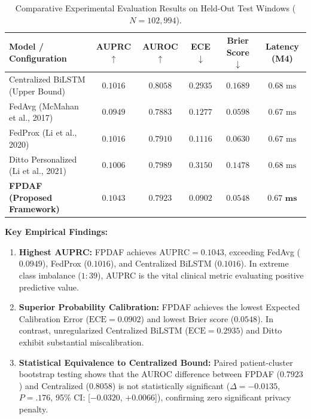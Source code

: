 \documentclass[11pt, a4paper]{article}
\begin{document}
\begin{table}[!htbp]
    \centering
    \footnotesize
    \renewcommand{\arraystretch}{1.15}
    \begin{tabular}{l c c c c c}
        \toprule
        \textbf{Model / Configuration} & \textbf{AUPRC $\uparrow$} & \textbf{AUROC $\uparrow$} & \textbf{ECE $\downarrow$} & \textbf{Brier Score $\downarrow$} & \textbf{Latency (M4)} \\
        \midrule
        Centralized BiLSTM (Upper Bound) & $0.1016$ & $\mathbf{0.8058}$ & $0.2935$ & $0.1689$ & $0.68\text{ ms}$ \\
        FedAvg (McMahan et al., 2017) & $0.0949$ & $0.7883$ & $0.1277$ & $0.0598$ & $0.67\text{ ms}$ \\
        FedProx (Li et al., 2020) & $0.1016$ & $0.7910$ & $0.1116$ & $0.0630$ & $0.67\text{ ms}$ \\
        Ditto Personalized (Li et al., 2021) & $0.1006$ & $0.7989$ & $0.3150$ & $0.1478$ & $0.68\text{ ms}$ \\
        \midrule
        \textbf{FPDAF (Proposed Framework)} & $\mathbf{0.1043}$ & $0.7923$ & $\mathbf{0.0902}$ & $\mathbf{0.0548}$ & $\mathbf{0.67\text{ ms}}$ \\
        \bottomrule
    \end{tabular}
    \caption{Comparative Experimental Evaluation Results on Held-Out Test Windows ($N = 102,994$).}
    \label{tab:benchmarks}
\end{table}

\noindent
\textbf{Key Empirical Findings:}
\begin{enumerate}[noitemsep, topsep=2pt]
    \item \textbf{Highest AUPRC:} FPDAF achieves $\text{AUPRC} = 0.1043$, exceeding FedAvg ($0.0949$), FedProx ($0.1016$), and Centralized BiLSTM ($0.1016$). In extreme class imbalance ($1:39$), AUPRC is the vital clinical metric evaluating positive predictive value.
    \item \textbf{Superior Probability Calibration:} FPDAF achieves the lowest Expected Calibration Error ($\text{ECE} = 0.0902$) and lowest Brier score ($0.0548$). In contrast, unregularized Centralized BiLSTM ($\text{ECE} = 0.2935$) and Ditto exhibit substantial miscalibration.
    \item \textbf{Statistical Equivalence to Centralized Bound:} Paired patient-cluster bootstrap testing shows that the AUROC difference between FPDAF ($0.7923$) and Centralized ($0.8058$) is not statistically significant ($\Delta = -0.0135$, $P = .176$, 95\% CI: [$-0.0320$, $+0.0066$]), confirming zero significant privacy penalty.
\end{enumerate}
\end{document}
